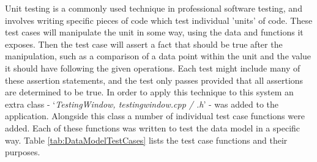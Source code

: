 Unit testing is a commonly used technique in professional software testing, and involves writing specific pieces of code which test individual 'units' of code. These test cases will manipulate the unit in some way, using the data and functions it exposes. Then the test case will assert a fact that should be true after the manipulation, such as a comparison of a data point within the unit and the value it should have following the given operations. Each test might include many of these assertion statements, and the test only passes provided that all assertions are determined to be true. In order to apply this technique to this system an extra class - `\textit{TestingWindow, testingwindow.cpp / .h}' - was added to the application. Alongside this class a number of individual test case functions were added. Each of these functions was written to test the data model in a specific way. Table \ref{tab:DataModelTestCases} lists the test case functions and their purposes.

